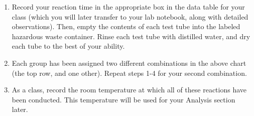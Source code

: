 \documentclass[11pt]{article}
\begin{document}
\begin{enumerate}
\item Record	 your	reaction	 time	in	 the	appropriate	box	in	 the	data	 table	 for	your	class	(which	 you	will	later	transfer	 to	your	lab	notebook,	along	with	detailed	
observations).		Then,	empty	the	contents	of	each	test	tube	into	the	labeled	hazardous	waste	container.		Rinse	each	test	tube	with	distilled	water,	and	dry	each	
tube	to	the	best	of	your	ability.	
	
\item Each	group	has	been	assigned	two	different	combinations	in	the	above	chart	(the	top	row,	and	one	other).		Repeat	steps	1-4	for	your	second	combination.	
	
\item As	a	class,	record	the	room	temperature	at	which	all	of	these	reactions	have	been	conducted.		This	temperature	will	be	used	for	your	Analysis	section	later.	
\end{enumerate}
\end{document}

